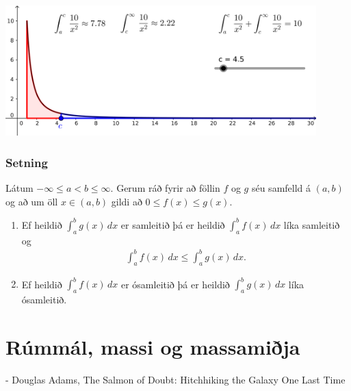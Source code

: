 \documentclass[a4paper,10pt,icelandic]{sphinxmanual}
\begin{document}
\begin{center}
\includegraphics[width=12cm,keepaspectratio=true]{07_samleitidheildi.png}
\end{center}



\subsection{Setning}
\label{\detokenize{kafli06:id11}}
Látum \(-\infty\leq a<b\leq \infty\). Gerum ráð fyrir að föllin
\(f\) og \(g\) séu samfelld á \((a, b)\) og að um öll
\(x\in (a, b)\) gildi að \(0\leq f(x)\leq g(x)\).
\begin{enumerate}
\item {} 
Ef heildið \(\int_a^b g(x)\,dx\) er samleitið þá er heildið
\(\int_a^b f(x)\,dx\) líka samleitið og
\begin{equation*}
\begin{split}\int_a^b f(x)\,dx \leq \int_a^b g(x)\,dx.\end{split}
\end{equation*}
\item {} 
Ef heildið \(\int_a^b f(x)\,dx\) er ósamleitið þá er heildið
\(\int_a^b g(x)\,dx\) líka ósamleitið.

\end{enumerate}


\chapter{Rúmmál, massi og massamiðja}
\label{\detokenize{kafli07:rummal-massi-og-massamija}}\label{\detokenize{kafli07::doc}}

- Douglas Adams, The Salmon of Doubt: Hitchhiking the Galaxy One Last Time
\end{document}
